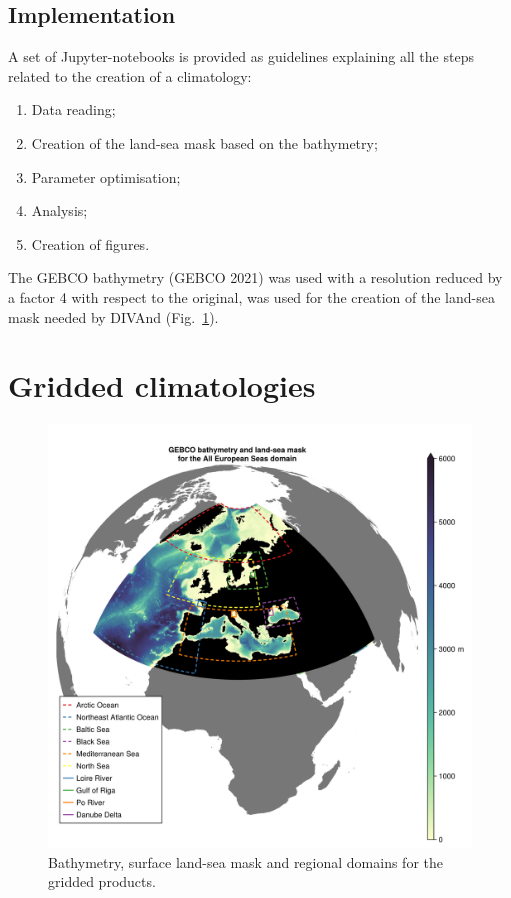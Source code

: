 \documentclass[essd, manuscript]{copernicus}
\begin{document}
\subsection{Implementation}

\citep{TROUPIN2025}
A set of Jupyter-notebooks \citep[https://jupyter.org][]{KLUYVER2016} is
provided as guidelines explaining all the steps related to the creation of a climatology:
\begin{enumerate}
\item Data reading;
\item Creation of the land-sea mask based on the bathymetry;
\item Parameter optimisation;
\item Analysis;
\item Creation of figures.
\end{enumerate}

The GEBCO bathymetry (GEBCO 2021) was used with a resolution reduced by a factor 4 with respect to the original, was used for the creation of the land-sea mask
needed by DIVAnd (Fig.~\ref{fig:gebco_bathy_mask_domains3}).


\section{Gridded climatologies\label{sec:clim}}

\citep{BUGA2021}


\begin{figure}[t]
\includegraphics[width=12cm]{gebco_bathy_mask_domains3}
\caption{Bathymetry, surface land-sea mask and regional domains for the gridded products.\label{fig:gebco_bathy_mask_domains3}}
\end{figure}
\end{document}
